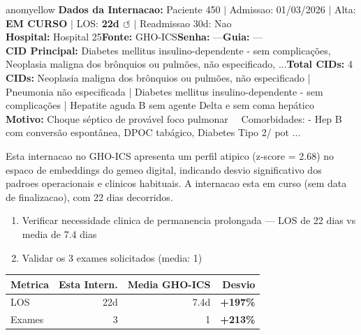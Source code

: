 \documentclass[a4paper,10pt]{article}
\begin{document}
\begin{anomalycard}[Internacao 381 | GHO-ICS | MODERADO (z=2.68)]{anomyellow}
\textbf{Dados da Internacao:} Paciente 450 $\mid$ Admissao: 01/03/2026 $\mid$ Alta: \textcolor{anomorange}{\textbf{EM CURSO}} $\mid$ LOS: \textbf{22d \textcolor{anomorange}{$\circlearrowleft$}} $\mid$ Readmissao 30d: Nao\\
\textbf{Hospital:} Hospital 25\quad\textbf{Fonte:} GHO-ICS\quad\textbf{Senha:} ---\quad\textbf{Guia:} ---\\
\textbf{CID Principal:} {\small Diabetes mellitus insulino-dependente - sem complicações, Neoplasia maligna dos brônquios ou pulmões, não especificado, ...}\quad\textbf{Total CIDs:} 4\\

\textbf{CIDs:} {\scriptsize Neoplasia maligna dos brônquios ou pulmões, não especificado | Pneumonia não especificada | Diabetes mellitus insulino-dependente - sem complicações | Hepatite aguda B sem agente Delta e sem coma hepático}\\

\textbf{Motivo:} {\scriptsize Choque séptico de provável foco pulmonar    Comorbidades: - Hep B com conversão espontânea, DPOC tabágico, Diabetes Tipo 2/ pot ...}\\

\vspace{2pt}\begin{tcolorbox}[colback=severityred!20,colframe=anomyellow,title={\textbf{Interpretacao de Negocio}},fonttitle=\bfseries\small,left=4pt,right=4pt,top=3pt,bottom=3pt]
{\small Esta internacao no GHO-ICS apresenta um perfil atipico (z-score = 2.68) no espaco de embeddings do gemeo digital, indicando desvio significativo dos padroes operacionais e clinicos habituais. A internacao esta em curso (sem data de finalizacao), com 22 dias decorridos.}
\end{tcolorbox}
\begin{tcolorbox}[colback=severityyellow!30,colframe=anomorange,title={\textbf{Recomendacoes Especificas}},fonttitle=\bfseries\small,left=4pt,right=4pt,top=3pt,bottom=3pt]
\begin{enumerate}[nosep,leftmargin=16pt]
\item {\small Verificar necessidade clinica de permanencia prolongada --- LOS de 22 dias vs media de 7.4 dias}
\item {\small Validar os 3 exames solicitados (media: 1)}
\end{enumerate}
\end{tcolorbox}
\begin{center}\begin{tabular}{l r r r}\toprule\textbf{Metrica} & \textbf{Esta Intern.} & \textbf{Media GHO-ICS} & \textbf{Desvio} \\\midrule
LOS & 22d & 7.4d & \textcolor{anomred}{\textbf{+197\%}} \\
Exames & 3 & 1 & \textcolor{anomred}{\textbf{+213\%}} \\
\bottomrule\end{tabular}\end{center}


\end{anomalycard}
\end{document}
